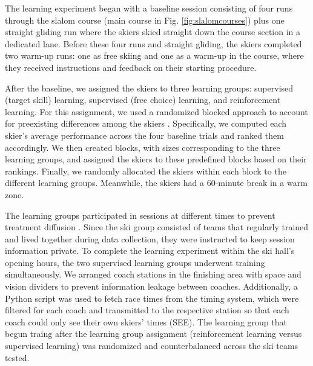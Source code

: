 The learning experiment began with a baseline session consisting of four runs through the slalom course (main course in Fig. \ref{fig:slalomcourses}) plus one straight gliding run where the skiers skied straight down the course section in a dedicated lane. Before these four runs and straight gliding, the skiers completed two warm-up runs: one as free skiing and one as a warm-up in the course, where they received instructions and feedback on their starting procedure. 

After the baseline, we assigned the skiers to three learning groups: supervised (target skill) learning, supervised (free choice) learning, and reinforcement learning. For this assignment, we used a randomized blocked approach to account for preexisting differences among the skiers \cite{maxwell_designing_2017}. Specifically, we computed each skier’s average performance across the four baseline trials and ranked them accordingly. We then created blocks, with sizes corresponding to the three learning groups, and assigned the skiers to these predefined blocks based on their rankings. Finally, we randomly allocated the skiers within each block to the different learning groups. Meanwhile, the skiers had a 60-minute break in a warm zone. 

The learning groups participated in sessions at different times to prevent treatment
diffusion \cite{maxwell_designing_2017}. Since the ski group consisted of teams that regularly trained and lived together during data collection, they were instructed to keep session information private. To complete the learning experiment within the ski hall's opening hours, the two supervised learning groups underwent training simultaneously. We arranged coach stations in the finishing area with space and vision dividers to prevent information leakage between coaches. Additionally, a Python script was used to fetch race times from the timing system, which were filtered for each coach and transmitted to the respective station so that each coach could only see their own skiers' times (SEE). The learning group that begun traing after the learning group assignment (reinforcement learning versus supervised learning) was randomized and counterbalanced across the ski teams tested. 


